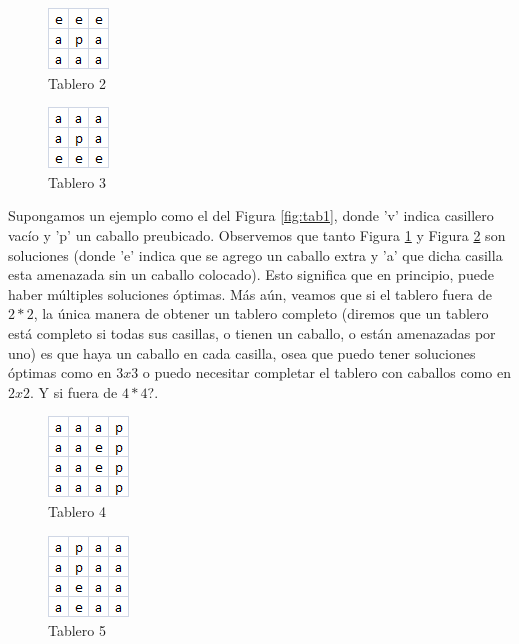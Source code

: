\begin{figure}[htb]
  \begin{center}
      \includegraphics[scale=1]{imagenes/tab2.png}
  \end{center}
  \caption{Tablero 2}\label{fig:tab2}
\end{figure}

\begin{figure}[htb]
  \begin{center}
      \includegraphics[scale=1]{imagenes/tab3.png}
  \end{center}
  \caption{Tablero 3}\label{fig:tab3}
\end{figure}

Supongamos un ejemplo como el del Figura \ref{fig:tab1}, donde 'v' indica casillero vacío y 'p' un caballo preubicado. Observemos que tanto Figura \ref{fig:tab2} y Figura \ref{fig:tab3} son soluciones (donde 'e' indica que se agrego un caballo extra y 'a' que dicha casilla esta amenazada sin un caballo colocado). Esto significa que en principio, puede haber múltiples soluciones óptimas. Más aún, veamos que si el tablero fuera de $2*2$, la única manera de obtener un tablero completo (diremos que un tablero está completo si todas sus casillas, o tienen un caballo, o están amenazadas por uno) es que haya un caballo en cada casilla, osea que puedo tener soluciones óptimas como en $3x3$ o puedo necesitar completar el tablero con caballos como en $2x2$. Y si fuera de $4*4$?.

\begin{figure}[htb]
  \begin{center}
      \includegraphics[scale=1]{imagenes/tab4.png}
  \end{center}
  \caption{Tablero 4}\label{fig:tab4}
\end{figure}

\begin{figure}[htb]
  \begin{center}
      \includegraphics[scale=1]{imagenes/tab5.png}
  \end{center}
  \caption{Tablero 5}\label{fig:tab5}
\end{figure}


